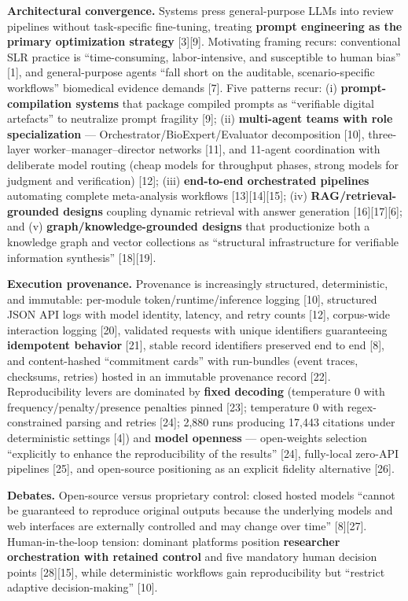 \documentclass[11pt]{article}
\begin{document}
\textbf{Architectural convergence.} Systems press general-purpose LLMs
into review pipelines without task-specific fine-tuning, treating
\textbf{prompt engineering as the primary optimization strategy}
{[}3{]}{[}9{]}. Motivating framing recurs: conventional SLR practice is
``time-consuming, labor-intensive, and susceptible to human bias''
{[}1{]}, and general-purpose agents ``fall short on the auditable,
scenario-specific workflows'' biomedical evidence demands {[}7{]}. Five
patterns recur: (i) \textbf{prompt-compilation systems} that package
compiled prompts as ``verifiable digital artefacts'' to neutralize
prompt fragility {[}9{]}; (ii) \textbf{multi-agent teams with role
specialization} --- Orchestrator/BioExpert/Evaluator decomposition
{[}10{]}, three-layer worker--manager--director networks {[}11{]}, and
11-agent coordination with deliberate model routing (cheap models for
throughput phases, strong models for judgment and verification)
{[}12{]}; (iii) \textbf{end-to-end orchestrated pipelines} automating
complete meta-analysis workflows {[}13{]}{[}14{]}{[}15{]}; (iv)
\textbf{RAG/retrieval-grounded designs} coupling dynamic retrieval with
answer generation {[}16{]}{[}17{]}{[}6{]}; and (v)
\textbf{graph/knowledge-grounded designs} that productionize both a
knowledge graph and vector collections as ``structural infrastructure
for verifiable information synthesis'' {[}18{]}{[}19{]}.

\textbf{Execution provenance.} Provenance is increasingly structured,
deterministic, and immutable: per-module token/runtime/inference logging
{[}10{]}, structured JSON API logs with model identity, latency, and
retry counts {[}12{]}, corpus-wide interaction logging {[}20{]},
validated requests with unique identifiers guaranteeing
\textbf{idempotent behavior} {[}21{]}, stable record identifiers
preserved end to end {[}8{]}, and content-hashed ``commitment cards''
with run-bundles (event traces, checksums, retries) hosted in an
immutable provenance record {[}22{]}. Reproducibility levers are
dominated by \textbf{fixed decoding} (temperature 0 with
frequency/penalty/presence penalties pinned {[}23{]}; temperature 0 with
regex-constrained parsing and retries {[}24{]}; 2,880 runs producing
17,443 citations under deterministic settings {[}4{]}) and \textbf{model
openness} --- open-weights selection ``explicitly to enhance the
reproducibility of the results'' {[}24{]}, fully-local zero-API
pipelines {[}25{]}, and open-source positioning as an explicit fidelity
alternative {[}26{]}.

\textbf{Debates.} Open-source versus proprietary control: closed hosted
models ``cannot be guaranteed to reproduce original outputs because the
underlying models and web interfaces are externally controlled and may
change over time'' {[}8{]}{[}27{]}. Human-in-the-loop tension: dominant
platforms position \textbf{researcher orchestration with retained
control} and five mandatory human decision points {[}28{]}{[}15{]},
while deterministic workflows gain reproducibility but ``restrict
adaptive decision-making'' {[}10{]}.
\end{document}
